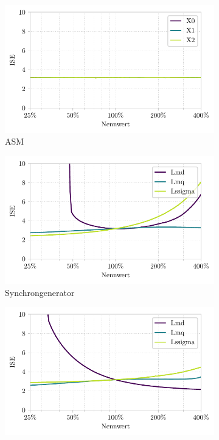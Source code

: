 \begin{figure}
    \captionsetup[subfigure]{aboveskip=1pt,belowskip=1pt}
    \centering
    \begin{subfigure}{\textwidth}
        \centering
        \includegraphics{Bilder/aimc_ISE.pdf}
        \caption{ASM}
        \label{fig:ISE_ASM}
    \end{subfigure}
    \begin{subfigure}{\textwidth}
        \centering
        \includegraphics{Bilder/smee_ISE.pdf}
        \caption{Synchrongenerator}
        \label{fig:ISE_SG}    
    \end{subfigure}
    \begin{subfigure}{\textwidth}
        \centering
        \includegraphics{Bilder/sM_E_ISE.pdf}

\end{subfigure}
\end{figure}
